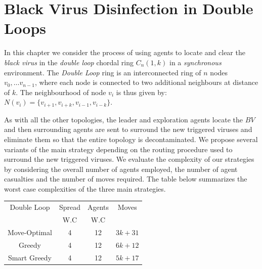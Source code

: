 


\chapter {Black Virus Disinfection in Double Loops}
\label{DL}
 


In this chapter we consider the process of using agents to locate and clear the {\it black virus}  in the {\it double loop} chordal ring $C_n(1,k)$  in a {\it synchronous} environment.  
The {\it Double Loop} ring is an interconnected ring of $n$ nodes $v_0, \ldots v_{n-1}$, where each node is connected to two additional neighbours at distance of $k$. 
The neighbourhood of node $v_i$ is thus given by: $N(v_{i})=\{v_{i+1},v_{i+k},v_{i-1},v_{i-k}\}$.



 As with all the other topologies,  the leader and exploration agents locate the  $BV$ and then surrounding agents are sent to surround the new triggered viruses  and  eliminate them so  that  the entire topology is decontaminated.
We propose several variants of the main strategy depending on the routing procedure used to surround the new triggered viruses.
We evaluate the complexity of our  strategies
 by considering the  overall number of agents employed, the number of agent casualties and the number of moves required. The table below summarizes the worst case  complexities of the three main strategies.

 

 
\begin{center}
  \begin{tabular}{|c|c|c|c|}
 \hline
   Double Loop      & Spread & Agents & Moves    \\
 &W.C&W.C& \\
 \hline
 Move-Optimal   &  4  & 12 & $3k+31$  \\ %
 \hline
 Greedy   &  4 &  12   &   $6k+12$\\
 \hline
 Smart Greedy   &  4  & 12 &   $5k+17$ \\
 \hline
 \end{tabular}
 \end{center}
 








